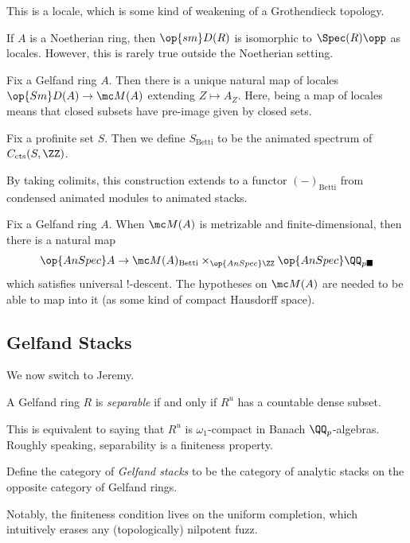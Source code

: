 \documentclass{article}
\begin{document}
\begin{remark}
	This is a locale, which is some kind of weakening of a Grothendieck topology.
\end{remark}
\begin{example}
	If $A$ is a Noetherian ring, then $\op{sm}D(R)$ is isomorphic to $\Spec(R)\opp$ as locales. However, this is rarely true outside the Noetherian setting.
\end{example}
\begin{remark}
	Fix a Gelfand ring $A$. Then there is a unique natural map of locales $\op{Sm}D(A)\to\mc M(A)$ extending $Z\mapsto A_Z$. Here, being a map of locales means that closed subsets have pre-image given by closed sets.
\end{remark}
\begin{notation}
	Fix a profinite set $S$. Then we define $S_{\mathrm{Betti}}$ to be the animated spectrum of $C_{\mathrm{cts}}(S,\ZZ)$.
\end{notation}
\begin{remark}
	By taking colimits, this construction extends to a functor $(-)_{\mathrm{Betti}}$ from condensed animated modules to animated stacks.
\end{remark}
\begin{remark}
	Fix a Gelfand ring $A$. When $\mc M(A)$ is metrizable and finite-dimensional, then there is a natural map
	\[\op{AnSpec}A\to\mc M(A)_{\mathrm{Betti}}\times_{\op{AnSpec}\ZZ}\op{AnSpec}\QQ_{p\blacksquare}\]
	which satisfies universal $!$-descent. The hypotheses on $\mc M(A)$ are needed to be able to map into it (as some kind of compact Hausdorff space).
\end{remark}

\subsection{Gelfand Stacks}
We now switch to Jeremy.
\begin{definition}[separable]
	A Gelfand ring $R$ is \textit{separable} if and only if $R^u$ has a countable dense subset.
\end{definition}
\begin{remark}
	This is equivalent to saying that $R^u$ is $\omega_1$-compact in Banach $\QQ_p$-algebras. Roughly speaking, separability is a finiteness property.
\end{remark}
\begin{definition}
	Define the category of \textit{Gelfand stacks} to be the category of analytic stacks on the opposite category of Gelfand rings.
\end{definition}
Notably, the finiteness condition lives on the uniform completion, which intuitively erases any (topologically) nilpotent fuzz.
\end{document}
